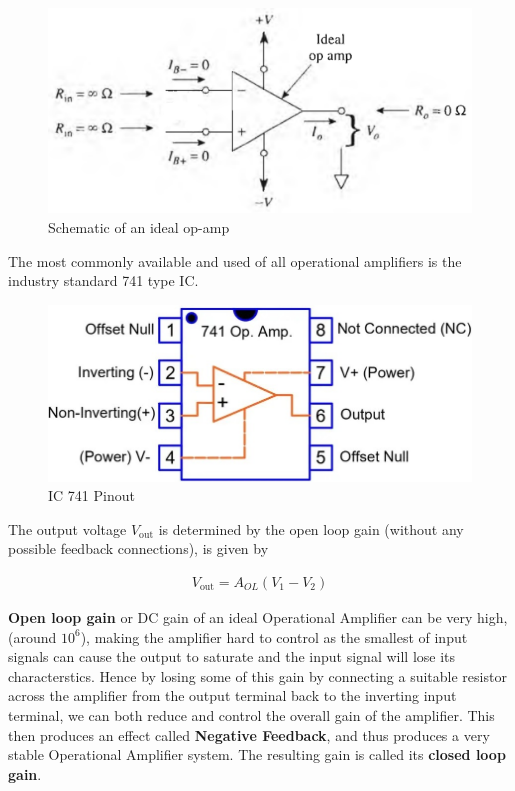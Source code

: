 \begin{figure}[H]
    \centering
    \includegraphics[width=0.90\columnwidth]{images/ideal.png}
    \caption{Schematic of an ideal op-amp\\}
    \label{fig:0}
\end{figure}

The most commonly available and used of all operational amplifiers is the industry standard 741 type IC. 

\begin{figure}[H]
    \centering
    \includegraphics[width=0.95\columnwidth]{images/pinout.jpeg}
    \caption{IC 741 Pinout}
    \label{fig:1}
\end{figure}

The output voltage $V_\text{out}$ is determined by the open loop gain (without any possible feedback connections), is given by 

\begin{align}V_\text{out}=A_{OL}(V_1-V_2)\end{align} 

\textbf{Open loop gain} or DC gain of an ideal Operational Amplifier can be very high, (around $10^6$), making the amplifier hard to control as the smallest of input signals can cause the output to saturate and the input signal will lose its characterstics. Hence by losing some of this gain by connecting a suitable resistor across the amplifier from the output terminal back to the inverting input terminal, we can both reduce and control the overall gain of the amplifier. This then produces an effect called \textbf{Negative Feedback}, and thus produces a very stable Operational Amplifier system. The resulting gain is called its \textbf{closed loop gain}.



